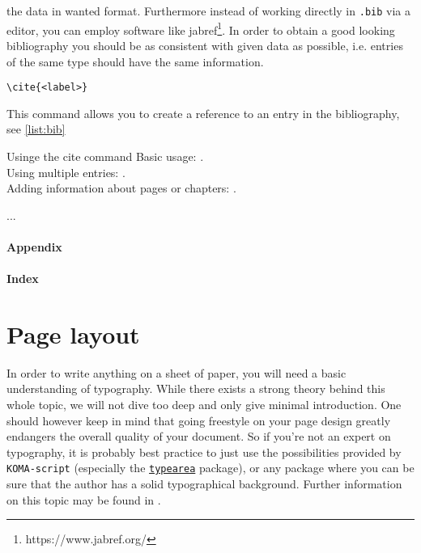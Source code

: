the data in wanted format. Furthermore instead of working directly in \texttt{.bib} 
via a editor, you can employ software like jabref\footnote{https://www.jabref.org/}. 
In order to obtain a good looking bibliography you should be as consistent with given 
data as possible, i.e. entries of the same type should have the same information.
\begin{emphBox}
\lstinline|\cite{<label>}|
\end{emphBox}
This command allows you to create a reference to an entry in the bibliography, 
see \cref{list:bib}
\begin{lstbox}[label=list:bib]{Usinge the cite command}
Basic usage: \cite{Evans15}.\\
Using multiple entries: \cite{Evans15, Kantorovich06}.\\
Adding information about pages or chapters: \cite[P. 87]{Evans15}.
\end{lstbox}
...\par
\paragraph{Appendix}
\kant
\par
\paragraph{Index}
\kant
\par
\section{Page layout}\label{sec:pagelay}
In order to write anything on a sheet of paper, you will need a basic understanding 
of typography. While there exists a strong theory behind this whole topic, we will 
not dive too deep and only give minimal introduction. One should however keep in mind that 
going freestyle on your page design greatly endangers the overall quality of your document. 
So if you're not an expert on typography, it is probably best practice to just use the 
possibilities provided by \texttt{KOMA-script} 
(especially the \href{https://ctan.org/pkg/enumitem}{\texttt{typearea}} package), 
or any package where you can be sure that 
the author has a solid typographical background. Further information on this topic may be 
found in \cite{Tschichold75, Willberg99}.
